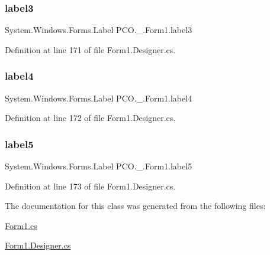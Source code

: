 \subsubsection{\texorpdfstring{label3}{label3}}
{\footnotesize\ttfamily System.\+Windows.\+Forms.\+Label P\+C\+O.\+\_.\+Form1.\+label3\hspace{0.3cm}{\ttfamily [private]}}



Definition at line 171 of file Form1.\+Designer.\+cs.

\mbox{\label{classPCO_1_1__0_1_1Form1_aa13c9160937ae7c6bd69f4cb984674e1}} 
\subsubsection{\texorpdfstring{label4}{label4}}
{\footnotesize\ttfamily System.\+Windows.\+Forms.\+Label P\+C\+O.\+\_.\+Form1.\+label4\hspace{0.3cm}{\ttfamily [private]}}



Definition at line 172 of file Form1.\+Designer.\+cs.

\mbox{\label{classPCO_1_1__0_1_1Form1_a617d8ed5e91d6d0827eff324fcf30292}} 
\subsubsection{\texorpdfstring{label5}{label5}}
{\footnotesize\ttfamily System.\+Windows.\+Forms.\+Label P\+C\+O.\+\_.\+Form1.\+label5\hspace{0.3cm}{\ttfamily [private]}}



Definition at line 173 of file Form1.\+Designer.\+cs.



The documentation for this class was generated from the following files\+:\begin{DoxyCompactItemize}
\item 
\hyperlink{Form1_8cs}{Form1.\+cs}\item 
\hyperlink{Form1_8Designer_8cs}{Form1.\+Designer.\+cs}\end{DoxyCompactItemize}
